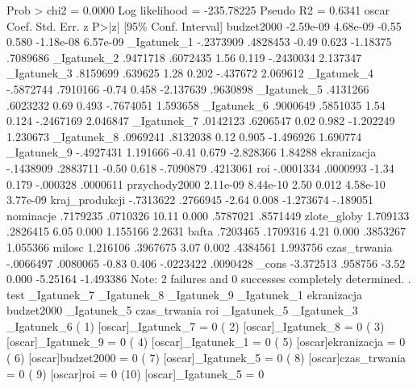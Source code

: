 \begin{stlog}
                                                  Prob > chi2     =     0.0000
Log likelihood = -235.78225                       Pseudo R2       =     0.6341
{\smallskip}
         oscar {\VBAR}      Coef.   Std. Err.      z    P>|z|     [95\% Conf. Interval]
    budzet2000 {\VBAR}  -2.59e-09   4.68e-09    -0.55   0.580    -1.18e-08    6.57e-09
   _Igatunek_1 {\VBAR}  -.2373909   .4828453    -0.49   0.623     -1.18375    .7089686
   _Igatunek_2 {\VBAR}   .9471718   .6072435     1.56   0.119    -.2430034    2.137347
   _Igatunek_3 {\VBAR}   .8159699    .639625     1.28   0.202     -.437672    2.069612
   _Igatunek_4 {\VBAR}  -.5872744   .7910166    -0.74   0.458    -2.137639    .9630898
   _Igatunek_5 {\VBAR}   .4131266   .6023232     0.69   0.493    -.7674051    1.593658
   _Igatunek_6 {\VBAR}   .9000649   .5851035     1.54   0.124    -.2467169    2.046847
   _Igatunek_7 {\VBAR}   .0142123   .6206547     0.02   0.982    -1.202249    1.230673
   _Igatunek_8 {\VBAR}   .0969241   .8132038     0.12   0.905    -1.496926    1.690774
   _Igatunek_9 {\VBAR}  -.4927431   1.191666    -0.41   0.679    -2.828366     1.84288
   ekranizacja {\VBAR}  -.1438909   .2883711    -0.50   0.618    -.7090879    .4213061
           roi {\VBAR}  -.0001334   .0000993    -1.34   0.179     -.000328    .0000611
 przychody2000 {\VBAR}   2.11e-09   8.44e-10     2.50   0.012     4.58e-10    3.77e-09
kraj_produkcji {\VBAR}  -.7313622   .2766945    -2.64   0.008    -1.273674    -.189051
     nominacje {\VBAR}   .7179235   .0710326    10.11   0.000     .5787021    .8571449
   zlote_globy {\VBAR}   1.709133   .2826415     6.05   0.000     1.155166      2.2631
         bafta {\VBAR}   .7203465   .1709316     4.21   0.000     .3853267    1.055366
        milosc {\VBAR}   1.216106   .3967675     3.07   0.002     .4384561    1.993756
  czas_trwania {\VBAR}  -.0066497   .0080065    -0.83   0.406    -.0223422    .0090428
         _cons {\VBAR}  -3.372513    .958756    -3.52   0.000     -5.25164   -1.493386
Note: 2 failures and 0 successes completely determined.
{\smallskip}
. test _Igatunek_7 _Igatunek_8 _Igatunek_9 _Igatunek_1 ekranizacja budzet2000 _Igatunek_5 czas_trwania roi 
_Igatunek_5 _Igatunek_3 _Igatunek_6
{\smallskip}
 ( 1)  [oscar]_Igatunek_7 = 0
 ( 2)  [oscar]_Igatunek_8 = 0
 ( 3)  [oscar]_Igatunek_9 = 0
 ( 4)  [oscar]_Igatunek_1 = 0
 ( 5)  [oscar]ekranizacja = 0
 ( 6)  [oscar]budzet2000 = 0
 ( 7)  [oscar]_Igatunek_5 = 0
 ( 8)  [oscar]czas_trwania = 0
 ( 9)  [oscar]roi = 0
 (10)  [oscar]_Igatunek_5 = 0

\end{stlog}
